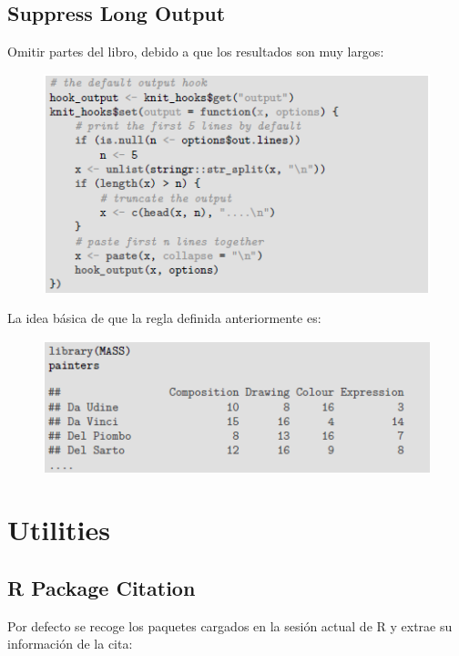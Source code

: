 \documentclass[10pt]{article}   			%
\begin{document}
\subsection{Suppress Long Output}

Omitir partes del libro, debido a que los resultados son muy largos:

\begin{figure}[ht] 
	\centering
		\includegraphics[scale=1.1]{Suppress1}
		\label{fig:Suppress1}
\end{figure}

\newpage
La idea básica de que la regla definida anteriormente es:

\begin{figure}[ht] 
	\centering
		\includegraphics[scale=1.1]{Suppress2} 
		\label{fig:Suppress2}
\end{figure}

\section{Utilities}
\subsection{R Package Citation}

Por defecto se recoge los paquetes cargados en la sesión actual de R y extrae su información de la cita:
\end{document}
